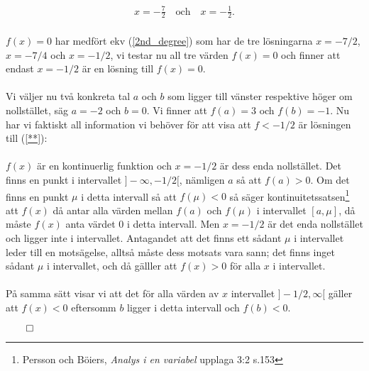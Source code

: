 \documentclass{article}
\begin{document}
\begin{gather*}
  x = -\frac{7}{2} \quad \text{och} \quad x = - \frac{1}{2}\text{.}
\end{gather*}
\\
$f(x) = 0$ har medfört ekv (\ref{2nd_degree}) som har de tre lösningarna $x = -7/2$, $x = -7/4$ och $x = -1/2$, vi testar nu all tre värden $f(x) = 0$ och finner att endast $x = -1/2$ är en lösning till $f(x) = 0$.
\\
\\
Vi väljer nu två konkreta tal $a$ och $b$ som ligger till vänster respektive höger om nollstället, säg $a = -2$ och $b = 0$. Vi finner att $f(a) = 3$ och $f(b) = -1$. Nu har vi faktiskt all information vi behöver för att visa att $f < -1/2$ är lösningen till (\ref{**}):
\\
\\
$f(x)$ är en kontinuerlig funktion och $x = -1/2$ är dess enda nollstället. Det finns en punkt i intervallet $]-\infty, -1/2[$, nämligen $a$ så att $f(a) > 0$. Om det finns en punkt $\mu$ i detta intervall så att $f(\mu) < 0$ så säger kontinuitetssatsen\footnote{Persson och Böiers, \emph{Analys i en variabel} upplaga 3:2 s.153} att $f(x)$ då antar alla värden mellan $f(a)$ och $f(\mu)$ i intervallet $[a, \mu]$, då måste $f(x)$ anta värdet $0$ i detta intervall. Men $x = -1/2$ är det enda nollstället och ligger inte i intervallet. Antagandet att det finns ett sådant $\mu$ i intervallet leder till en motsägelse, alltså måste dess motsats vara sann; det finns inget sådant $\mu$ i intervallet, och då gälller att $f(x) > 0$ för alla $x$ i intervallet.
\\
\\På samma sätt visar vi att det för alla värden av $x$ intervallet $ ]-1/2, \infty[$ gäller att $f(x) < 0$ eftersomm $b$ ligger i detta intervall och $f(b) < 0$.

\centerline{$\qed$}
\end{document}
